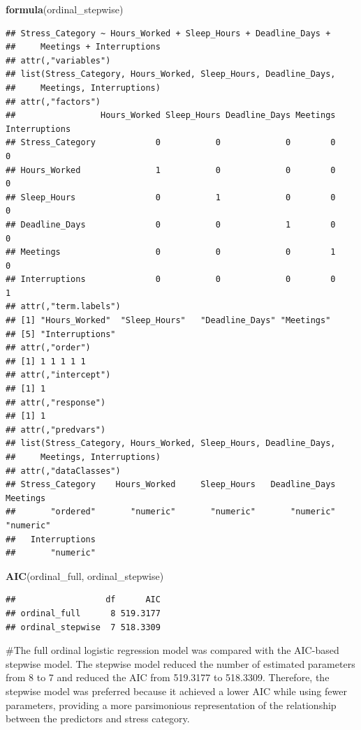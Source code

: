 \documentclass[
]{article}
\newenvironment{Shaded}{\begin{snugshade}}{\end{snugshade}}
\newcommand{\FunctionTok}[1]{\textcolor[rgb]{0.13,0.29,0.53}{\textbf{#1}}}
\newcommand{\NormalTok}[1]{#1}
\begin{document}
\begin{Shaded}
\begin{Highlighting}[]
\FunctionTok{formula}\NormalTok{(ordinal\_stepwise)}
\end{Highlighting}
\end{Shaded}

\begin{verbatim}
## Stress_Category ~ Hours_Worked + Sleep_Hours + Deadline_Days + 
##     Meetings + Interruptions
## attr(,"variables")
## list(Stress_Category, Hours_Worked, Sleep_Hours, Deadline_Days, 
##     Meetings, Interruptions)
## attr(,"factors")
##                 Hours_Worked Sleep_Hours Deadline_Days Meetings Interruptions
## Stress_Category            0           0             0        0             0
## Hours_Worked               1           0             0        0             0
## Sleep_Hours                0           1             0        0             0
## Deadline_Days              0           0             1        0             0
## Meetings                   0           0             0        1             0
## Interruptions              0           0             0        0             1
## attr(,"term.labels")
## [1] "Hours_Worked"  "Sleep_Hours"   "Deadline_Days" "Meetings"     
## [5] "Interruptions"
## attr(,"order")
## [1] 1 1 1 1 1
## attr(,"intercept")
## [1] 1
## attr(,"response")
## [1] 1
## attr(,"predvars")
## list(Stress_Category, Hours_Worked, Sleep_Hours, Deadline_Days, 
##     Meetings, Interruptions)
## attr(,"dataClasses")
## Stress_Category    Hours_Worked     Sleep_Hours   Deadline_Days        Meetings 
##       "ordered"       "numeric"       "numeric"       "numeric"       "numeric" 
##   Interruptions 
##       "numeric"
\end{verbatim}

\begin{Shaded}
\begin{Highlighting}[]
\FunctionTok{AIC}\NormalTok{(ordinal\_full, ordinal\_stepwise)}
\end{Highlighting}
\end{Shaded}

\begin{verbatim}
##                  df      AIC
## ordinal_full      8 519.3177
## ordinal_stepwise  7 518.3309
\end{verbatim}

\#The full ordinal logistic regression model was compared with the
AIC-based stepwise model. The stepwise model reduced the number of
estimated parameters from 8 to 7 and reduced the AIC from 519.3177 to
518.3309. Therefore, the stepwise model was preferred because it
achieved a lower AIC while using fewer parameters, providing a more
parsimonious representation of the relationship between the predictors
and stress category.
\end{document}
